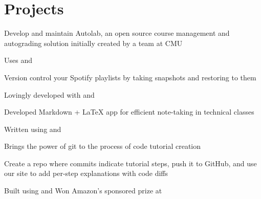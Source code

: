 \documentclass[]{deedy-resume-openfont}
\begin{document}
\begin{minipage}[t]{0.66\textwidth}

\section{Projects}
\descript{}
\begin{tightemize}
\item Develop and maintain Autolab, an open source course management and
  autograding solution initially created by a team at CMU
\item Uses  and 
\end{tightemize}
\sectionsep

\descript{}
\begin{tightemize}
\item Version control your Spotify playlists by taking snapshots and restoring
  to them
\item Lovingly developed with  and 
\end{tightemize}
\sectionsep

\descript{}
\begin{tightemize}
\item Developed Markdown + \LaTeX{} app for efficient note-taking in technical
  classes
\item Written using  and 
\end{tightemize}
\sectionsep

\descript{}
\begin{tightemize}
\item Brings the power of git to the process of code tutorial creation
\item Create a repo where commits indicate tutorial steps, push it to GitHub,
  and use our site to add per-step explanations with code diffs
\item Built using  and  Won Amazon's
  sponsored prize at 
\end{tightemize}
\sectionsep


\end{minipage}
\end{document}

